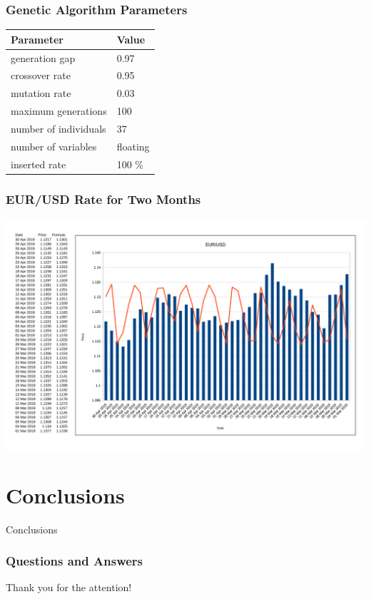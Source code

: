\documentclass{beamer}
\begin{document}
\begin{frame}
\frametitle{Genetic Algorithm Parameters}
\begin{table}
	\begin{tabular}{p{5.4cm}p{4.4cm}}
		\hline
		\textbf{Parameter} & \textbf{Value} \\
		\hline
		generation gap & 0.97 \\
		crossover rate & 0.95 \\
		mutation rate & 0.03 \\
		maximum generations & 100 \\
		number of individuals & 37 \\
		number of variables & floating \\
		inserted rate & 100 \% \\
		\hline
	\end{tabular}
\end{table}
\end{frame}

\begin{frame}
\frametitle{EUR/USD Rate for Two Months}
\includegraphics[scale=0.09]{fig01.png}
\end{frame}

\section{Conclusions}

\begin{frame}
\center \huge{Conclusions}
\end{frame}

\begin{frame}
\frametitle{Questions and Answers}
\center \huge{Thank you for the attention!}
\end{frame}
\end{document}
